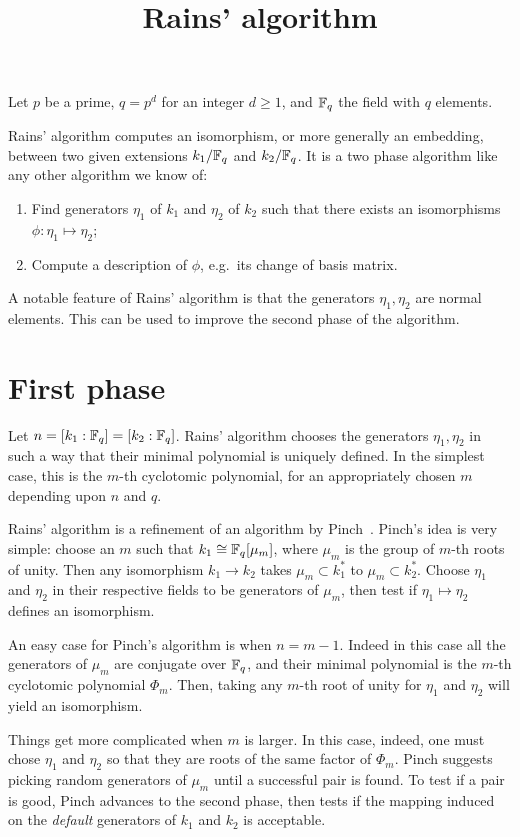 \documentclass{article}
\title{Rains' algorithm}
\begin{document}
\maketitle

Let $p$ be a prime, $q=p^d$ for an integer $d\ge1$, and $\mathbb{F}_q$ the
field with $q$ elements.

Rains' algorithm computes an isomorphism, or more generally an
embedding, between two given extensions $k_1/\mathbb{F}_q$ and $k_2/\mathbb{F}_q$. It
is a two phase algorithm like any other algorithm we know of:
\begin{enumerate}
\item Find generators $\eta_1$ of $k_1$ and $\eta_2$ of $k_2$ such
that there exists an isomorphisms $\phi:\eta_1\mapsto\eta_2$;
\item Compute a description of $\phi$, e.g.\ its change of basis
matrix.
\end{enumerate}

A notable feature of Rains' algorithm is that the generators
$\eta_1,\eta_2$ are normal elements. This can be used to improve the
second phase of the algorithm.

\section{First phase}

Let $n=[k_1:\mathbb{F}_q]=[k_2:\mathbb{F}_q]$. Rains' algorithm chooses the generators
$\eta_1,\eta_2$ in such a way that their minimal polynomial is
uniquely defined. In the simplest case, this is the $m$-th cyclotomic
polynomial, for an appropriately chosen $m$ depending upon $n$ and
$q$.

Rains' algorithm is a refinement of an algorithm by
Pinch~\cite{todo}. Pinch's idea is very simple: choose an $m$ such
that $k_1\cong\mathbb{F}_q[\mu_m]$, where $\mu_m$ is the group of $m$-th roots
of unity. Then any isomorphism $k_1\to k_2$ takes $\mu_m\subset
k_1^\ast$ to $\mu_m\subset k_2^\ast$. Choose $\eta_1$ and $\eta_2$ in
their respective fields to be generators of $\mu_m$, then test if
$\eta_1\mapsto\eta_2$ defines an isomorphism.

An easy case for Pinch's algorithm is when $n=m-1$. Indeed in this
case all the generators of $\mu_m$ are conjugate over $\mathbb{F}_q$, and
their minimal polynomial is the $m$-th cyclotomic polynomial
$\Phi_m$. Then, taking any $m$-th root of unity for $\eta_1$ and
$\eta_2$ will yield an isomorphism.

Things get more complicated when $m$ is larger. In this case, indeed,
one must chose $\eta_1$ and $\eta_2$ so that they are roots of the
same factor of $\Phi_m$. Pinch suggests picking random generators of
$\mu_m$ until a successful pair is found. To test if a pair is good,
Pinch advances to the second phase, then tests if the mapping induced
on the \emph{default} generators of $k_1$ and $k_2$ is acceptable.
\end{document}
